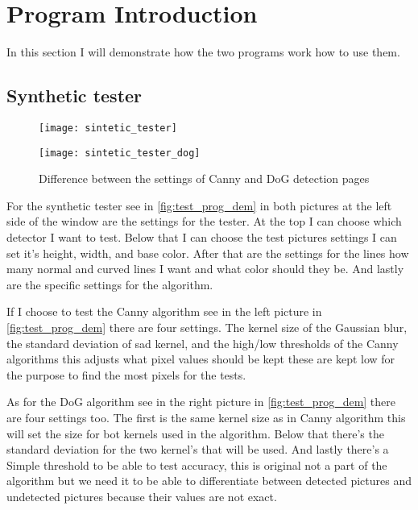 \section{Program Introduction}

In this section I will demonstrate how the two programs work how to use them.

\subsection{Synthetic tester}
\label{chap:tester}

\begin{figure}[H]
\centering
\begin{minipage}[t]{.49\textwidth}
\centering
\texttt{[image: sintetic\_tester]}
\end{minipage}
\begin{minipage}[t]{.49\textwidth}
\centering
\texttt{[image: sintetic\_tester\_dog]}
\end{minipage}
\caption{Difference between the settings of \ac{Canny} and \ac{DoG} detection pages}
\label{fig:test_prog_dem}
\end{figure}

For the synthetic tester see in \autoref{fig:test_prog_dem} in both pictures at the left side of the window are the settings for the tester. At the top I can choose which detector I want to test. Below that I can choose the test pictures settings I can set it's height, width, and base color. After that are the settings for the lines how many normal and curved lines I want and what color should they be. And lastly are the specific settings for the algorithm. 

If I choose to test the \ac{Canny} algorithm see in the left picture in \autoref{fig:test_prog_dem} there are four settings. The kernel size of the Gaussian blur, the standard deviation of sad kernel, and the high/low thresholds of the \ac{Canny} algorithms this adjusts what pixel values should be kept these are kept low for the purpose to find the most pixels for the tests. 

As for the \ac{DoG} algorithm see in the right picture in \autoref{fig:test_prog_dem} there are four settings too. The first is the same kernel size as in \ac{Canny} algorithm this will set the size for bot kernels used in the algorithm. Below that there's the standard deviation for the two kernel's that will be used. And lastly there's a Simple threshold to be able to test accuracy, this is original not a part of the algorithm but we need it to be able to differentiate between detected pictures and undetected pictures because their values are not exact.

